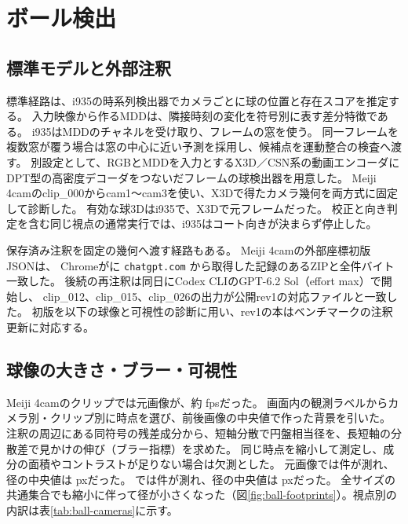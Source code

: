 \section{ボール検出}
\label{sec:ball-detection}

\subsection{標準モデルと外部注釈}

標準経路は、i935の時系列検出器でカメラごとに球の位置と存在スコアを推定する。
入力映像から作るMDDは、隣接時刻の変化を符号別に表す差分特徴である。
i935はMDDのチャネルを受け取り、フレームの窓を使う。
同一フレームを複数窓が覆う場合は窓の中心に近い予測を採用し、候補点を運動整合の検査へ渡す。
別設定として、RGBとMDDを入力とするX3D／CSN系の動画エンコーダ\cite{x3d,csn}に
DPT型の高密度デコーダ\cite{dpt}をつないだフレームの球検出器を用意した。
Meiji 4camのclip\_000からcam1〜cam3を使い、X3Dで得たカメラ幾何を両方式に固定して診断した。
有効な球3Dはi935で、X3Dで元フレームだった。
校正と向き判定を含む同じ視点の通常実行では、i935はコート向きが決まらず停止した。

保存済み注釈を固定の幾何へ渡す経路もある。
Meiji 4camの外部座標初版 JSONは、
Chromeがに \texttt{chatgpt.com} から取得した記録のあるZIPと全件バイト一致した。
後続の再注釈は同日にCodex CLIのGPT-6.2 Sol（effort max）で開始し、
clip\_012、clip\_015、clip\_026の出力が公開rev1の対応ファイルと一致した。
初版を以下の球像と可視性の診断に用い、rev1の本はベンチマークの注釈更新に対応する。

\subsection{球像の大きさ・ブラー・可視性}

Meiji 4camのクリップでは元画像が、約 fpsだった。
画面内の観測ラベルからカメラ別・クリップ別に時点を選び、前後画像の中央値で作った背景を引いた。
注釈の周辺にある同符号の残差成分から、短軸分散で円盤相当径を、長短軸の分散差で見かけの伸び（ブラー指標）を求めた。
同じ時点を縮小して測定し、成分の面積やコントラストが足りない場合は欠測とした。
元画像では件が測れ、径の中央値は pxだった。
では件が測れ、径の中央値は pxだった。
全サイズの共通集合でも縮小に伴って径が小さくなった（図\ref{fig:ball-footprints}）。視点別の内訳は表\ref{tab:ball-cameras}に示す。


